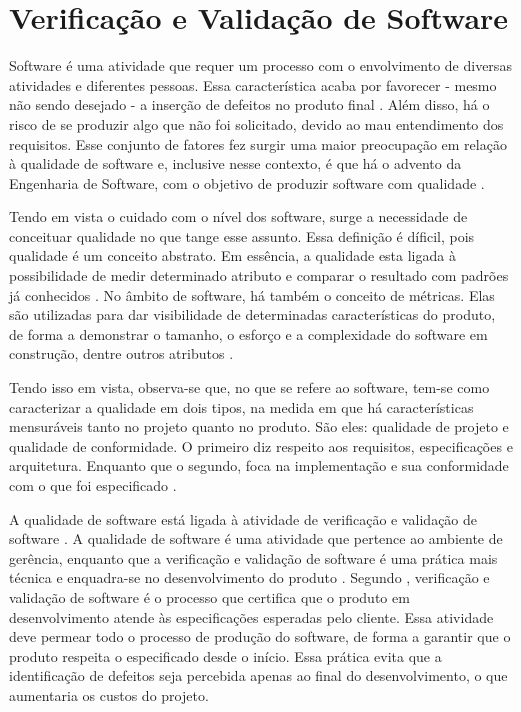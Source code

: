 \section{Verificação e Validação de Software}
Software é uma atividade que requer um processo com o envolvimento de diversas atividades e diferentes pessoas. Essa característica acaba por favorecer - mesmo não sendo desejado - a inserção de defeitos no produto final \cite{trodo2009}. Além disso, há o risco de se produzir algo que não foi solicitado, devido ao mau entendimento dos requisitos\cite{barbosaEtAl2009}. Esse conjunto de fatores fez surgir uma maior preocupação em relação à qualidade de software e, inclusive nesse contexto, é que há o advento da Engenharia de Software, com o objetivo de produzir software com qualidade \cite{buenoCampelo2013}.
\par
\indent Tendo em vista o cuidado com o nível dos software, surge a necessidade de conceituar qualidade no que tange esse assunto. Essa definição é díficil, pois qualidade é um conceito abstrato. Em essência, a qualidade esta ligada à possibilidade de medir determinado atributo e comparar o resultado com padrões já conhecidos \cite{buenoCampelo2013}. No âmbito de software, há também o conceito de métricas. Elas são utilizadas para dar visibilidade de determinadas características do produto, de forma a demonstrar o tamanho, o esforço e a complexidade do software em construção, dentre outros atributos \cite{abreu2011}.
\par
\indent Tendo isso em vista, observa-se que, no que se refere ao software, tem-se como caracterizar a qualidade em dois tipos, na medida em que há características mensuráveis tanto no projeto quanto no produto. São eles: qualidade de projeto e qualidade de conformidade. O primeiro diz respeito aos requisitos, especificações e arquitetura. Enquanto que o segundo, foca na implementação e sua conformidade com o que foi especificado \cite{buenoCampelo2013}.
\par
\indent A qualidade de software está ligada à atividade de verificação e validação de software \cite{buenoCampelo2013}. A qualidade de software é uma atividade que pertence ao ambiente de gerência, enquanto que a verificação e validação de software é uma prática mais técnica e enquadra-se no desenvolvimento do produto \cite{buenoCampelo2013}. Segundo , verificação e validação de software é o processo que certifica que o produto em desenvolvimento atende às especificações esperadas pelo cliente. Essa atividade deve permear todo o processo de produção do software, de forma a garantir que o produto respeita o especificado desde o início. Essa prática evita que a identificação de defeitos seja percebida apenas ao final do desenvolvimento, o que aumentaria os custos do projeto.
